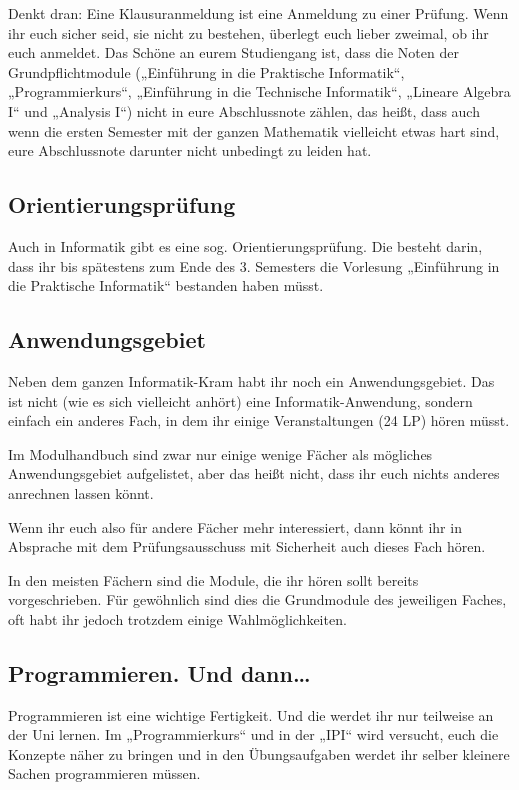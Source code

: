 Denkt dran: Eine Klausuranmeldung ist eine Anmeldung zu einer Prüfung. Wenn ihr
euch sicher seid, sie nicht zu bestehen, überlegt euch lieber zweimal, ob ihr
euch anmeldet. Das Schöne an eurem Studiengang ist, dass die Noten der
Grundpflichtmodule („Einführung in die Praktische Informatik“, „Programmierkurs“,
„Einführung in die Technische Informatik“, „Lineare Algebra I“ und „Analysis I“)
nicht in eure Abschlussnote zählen, das heißt, dass auch
wenn die ersten Semester mit der ganzen Mathematik vielleicht etwas hart sind,
eure Abschlussnote darunter nicht unbedingt zu leiden hat.


\subsection{Orientierungsprüfung}

Auch in Informatik gibt es eine sog. Orientierungsprüfung. Die besteht darin,
dass ihr bis spätestens zum Ende des 3. Semesters die Vorlesung
„Einführung in die Praktische Informatik“ bestanden haben müsst.


\subsection{Anwendungsgebiet}

Neben dem ganzen Informatik-Kram habt ihr noch ein Anwendungsgebiet.
Das ist nicht (wie es sich vielleicht anhört) eine Informatik-Anwendung,
sondern einfach ein anderes Fach, in dem ihr einige Veranstaltungen (24 \gls{LP}) hören müsst.

Im Modulhandbuch sind zwar nur einige wenige Fächer als mögliches Anwendungsgebiet aufgelistet,
aber das heißt nicht, dass ihr euch nichts anderes anrechnen lassen könnt.

Wenn ihr euch also für andere Fächer mehr interessiert, dann könnt ihr in Absprache mit dem Prüfungsausschuss mit Sicherheit auch dieses Fach hören.

In den meisten Fächern sind die Module, die ihr hören sollt bereits vorgeschrieben. Für gewöhnlich sind dies die Grundmodule des jeweiligen Faches, oft habt ihr jedoch trotzdem einige Wahlmöglichkeiten.


\subsection{Programmieren. Und dann\dots}

Programmieren ist eine wichtige Fertigkeit. Und die werdet ihr nur teilweise an
der Uni lernen. Im „Programmierkurs“ und in der „IPI“ wird versucht, euch die
Konzepte näher zu bringen und in den Übungsaufgaben werdet ihr selber kleinere
Sachen programmieren müssen.

